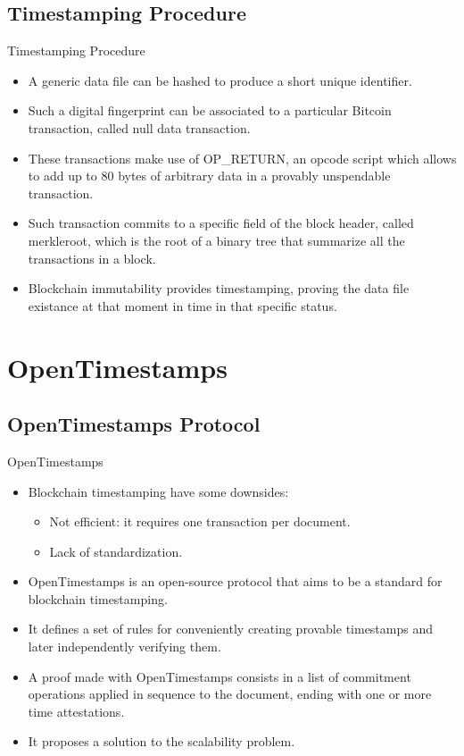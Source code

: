 \documentclass[usenames,dvipsnames]{beamer}
\begin{document}
    \subsection{Timestamping Procedure}
    \begin{frame}{Timestamping Procedure}
        \begin{itemize}
            \item A generic data file can be \alert{hashed} to produce a short unique identifier.
            \item Such a \alert{digital fingerprint} can be associated to a particular Bitcoin transaction, called \alert{null data transaction}.
            \item These transactions make use of \alert{OP\_RETURN}, an opcode script which allows to add up to 80 bytes of arbitrary data in a \alert{provably unspendable} transaction.
            \item Such transaction \alert{commits} to a specific field of the block header, called \alert{merkleroot}, which is the root of a binary tree that summarize all the transactions in a block.
            \item Blockchain \alert{immutability} provides \alert{timestamping}, proving the data file existance at that moment in time in that specific status.
        \end{itemize}    
    \end{frame}
    
    \section{OpenTimestamps}
    \subsection{OpenTimestamps Protocol}
    \begin{frame}{OpenTimestamps}
        \begin{itemize}
            \item Blockchain timestamping have some \alert{downsides}:
            \begin{itemize}
                \item Not efficient: it requires one transaction per document.
                \item Lack of standardization.
            \end{itemize}
            \item \alert{OpenTimestamps} is an open-source protocol that aims to be a \alert{standard} for blockchain timestamping.
            \item It defines a set of rules for \alert{conveniently} creating \alert{provable timestamps} and later \alert{independently verifying} them.
            \item A \alert{proof} made with OpenTimestamps consists in a list of \alert{commitment operations} applied in sequence to the document, ending with one or more \alert{time attestations}.
            \item It proposes a \alert{solution} to the \alert{scalability problem}.
        \end{itemize}
    \end{frame}
    
\end{document}
